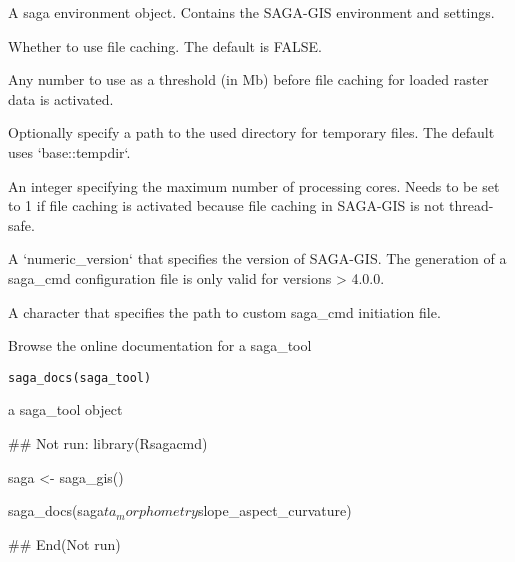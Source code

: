 \documentclass[a4paper]{book}
\begin{document}
%
\begin{Arguments}
\begin{ldescription}
\item[\code{senv}] A saga environment object. Contains the SAGA-GIS environment and
settings.

\item[\code{grid\_caching}] Whether to use file caching. The default is FALSE.

\item[\code{grid\_cache\_threshold}] Any number to use as a threshold (in Mb) before
file caching for loaded raster data is activated.

\item[\code{grid\_cache\_dir}] Optionally specify a path to the used directory for
temporary files. The default uses `base::tempdir`.

\item[\code{cores}] An integer specifying the maximum number of processing cores.
Needs to be set to 1 if file caching is activated because file caching in
SAGA-GIS is not thread-safe.

\item[\code{saga\_vers}] A `numeric\_version` that specifies the version of SAGA-GIS.
The generation of a saga\_cmd configuration file is only valid for versions
> 4.0.0.
\end{ldescription}
\end{Arguments}
%
\begin{Value}
A character that specifies the path to custom saga\_cmd initiation
file.
\end{Value}
%
\begin{Description}
Browse the online documentation for a saga\_tool
\end{Description}
%
\begin{Usage}
\begin{verbatim}
saga_docs(saga_tool)
\end{verbatim}
\end{Usage}
%
\begin{Arguments}
\begin{ldescription}
\item[\code{saga\_tool}] a saga\_tool object
\end{ldescription}
\end{Arguments}
%
\begin{Examples}
\begin{ExampleCode}
## Not run: 
library(Rsagacmd)

saga <- saga_gis()

saga_docs(saga$ta_morphometry$slope_aspect_curvature)

## End(Not run)
\end{ExampleCode}
\end{Examples}
\end{document}
